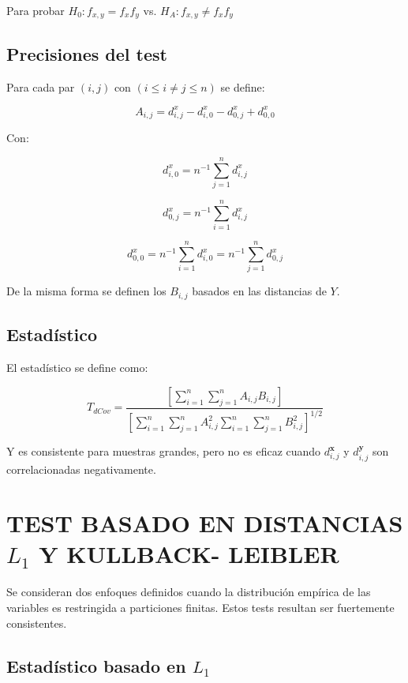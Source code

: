 \documentclass[]{book}
\begin{document}
Para probar \(H_0: f_{x,y}= f_xf_y\) vs. \(H_A: f_{x,y}\neq f_xf_y\)

\section{Precisiones del test}\label{precisiones-del-test-1}

Para cada par \((i,j)\) con \((i \leq i \neq j \leq n)\) se define:

\[A_{i,j} = d_{i,j}^x - d_{i,0}^x - d_{0,j}^x + d_{0,0}^x\]

Con:

\[d_{i,0}^x =  n^{-1} \sum_{j=1}^n d_{i,j}^x\]

\[d_{0,j}^x = n^{-1} \sum_{i=1}^n d_{i,j}^x\]

\[d_{0,0}^x = n^{-1} \sum_{i=1}^n d_{i,0}^x =  n^{-1} \displaystyle\sum_{j=1}^n d_{0,j}^x \]

De la misma forma se definen los \(B_{i,j}\) basados en las distancias
de \(Y\).

\section{Estadístico}\label{estadistico}

El estadístico se define como:

\[T_{dCov}=\dfrac{ \displaystyle \left[ \sum_{i=1}^n \sum_{j=1}^n A_{i,j}B_{i,j} \right]}{ \displaystyle  \left[  \sum_{i=1}^n \sum_{j=1}^n  A_{i,j}^2  \sum_{i=1}^n \sum_{j=1}^n B_{i,j}^2 \right]^{1/2}}  \]

Y es consistente para muestras grandes, pero no es eficaz cuando
\(d_{i,j}^\mathbf{x}\) y \(d_{i,j}^\mathbf{y}\) son correlacionadas
negativamente.

\chapter{\texorpdfstring{TEST BASADO EN DISTANCIAS \(L_1\) Y KULLBACK-
LEIBLER}{TEST BASADO EN DISTANCIAS L\_1 Y KULLBACK- LEIBLER}}\label{test-basado-en-distancias-l_1-y-kullback--leibler}

Se consideran dos enfoques definidos cuando la distribución empírica de
las variables es restringida a particiones finitas. Estos tests resultan
ser fuertemente consistentes.

\section{\texorpdfstring{Estadístico basado en
\(L_1\)}{Estadístico basado en L\_1}}\label{estadistico-basado-en-l_1}
\end{document}
